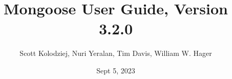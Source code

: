 \title{Mongoose User Guide, Version 3.2.0}
\author{Scott Kolodziej, Nuri Yeralan, Tim Davis, William W. Hager}
\date{Sept 5, 2023}
